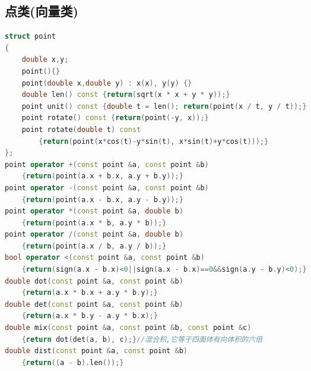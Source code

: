 \documentclass[landscape,a4paper]{article}
\begin{document}
\begin{spacing}{0.3}
\begin{multicols}{3}
\subsection{点类(向量类)}
\begin{lstlisting}[language=C++]
struct point
{
	double x,y;
	point(){}
	point(double x,double y) : x(x), y(y) {}
	double len() const {return(sqrt(x * x + y * y));}
	point unit() const {double t = len(); return(point(x / t, y / t));}
	point rotate() const {return(point(-y, x));}
	point rotate(double t) const
        {return(point(x*cos(t)-y*sin(t), x*sin(t)+y*cos(t)));}
};
point operator +(const point &a, const point &b)
    {return(point(a.x + b.x, a.y + b.y));}
point operator -(const point &a, const point &b)
    {return(point(a.x - b.x, a.y - b.y));}
point operator *(const point &a, double b)
    {return(point(a.x * b, a.y * b));}
point operator /(const point &a, double b)
    {return(point(a.x / b, a.y / b));}
bool operator <(const point &a, const point &b)
    {return(sign(a.x - b.x)<0||sign(a.x - b.x)==0&&sign(a.y - b.y)<0);}
double dot(const point &a, const point &b)
    {return(a.x * b.x + a.y * b.y);}
double det(const point &a, const point &b)
    {return(a.x * b.y - a.y * b.x);}
double mix(const point &a, const point &b, const point &c)　
    {return dot(det(a, b), c);}//混合积,它等于四面体有向体积的六倍
double dist(const point &a, const point &b)
    {return((a - b).len());}
\end{lstlisting}

\end{multicols}
\end{spacing}
\end{document}
